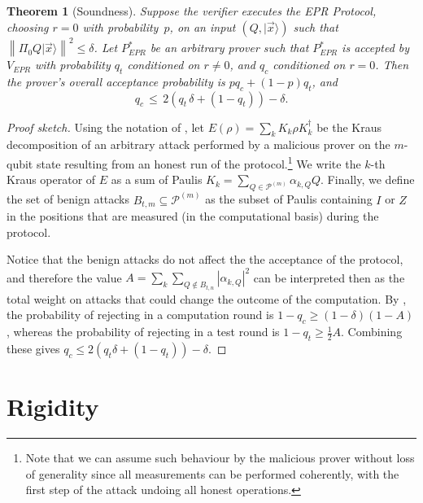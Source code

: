 \documentclass[11pt]{article}
\newtheorem{theorem}{Theorem}
\newcommand{\ket}[1]{|#1\rangle}
\newcommand{\norm}[1]{\left\|#1\right\|}
\newcommand{\paulin}{\mathcal{P}^{(m)}\!}
\begin{document}
\begin{theorem}[Soundness]\label{thm:EPR-soundness} 
Suppose the verifier executes the EPR Protocol, choosing $r=0$ with probability~$p$, on an input $(Q,\ket{\vec{x}})$ such that $\norm{\Pi_0 Q\ket{\vec{x}}}^2\leq \delta$. Let $P_{EPR}^*$ be an arbitrary prover such that $P_{EPR}^*$ is accepted by  $V_{EPR}$ with probability $q_t$ conditioned on $r\neq 0$, and $q_c$ conditioned on $r=0$. Then the prover's overall acceptance probability is $pq_c+(1-p)q_t$, and
$$q_c \,\leq\, 2\left(q_t\,\delta+(1-q_t)\right)-\delta.$$ 
\end{theorem}
\begin{proof}[Proof sketch]
Using the notation of \cite{broadbent15howtoverify}, let $E(\rho) = \sum_{k} K_k \rho K_k^\dagger$ be the Kraus decomposition of an arbitrary attack  performed by a malicious prover on the $m$-qubit state resulting from an honest run of the protocol.\footnote{Note that we can assume such behaviour by the malicious prover without loss of generality since  all measurements can be performed coherently, with the first step of the attack undoing all honest operations.}  We write the $k$-th Kraus operator of $E$ as a sum of Paulis $K_k = \sum_{Q\in
  \paulin} \alpha_{k,Q} Q$. Finally, we define the set of benign attacks $B_{t,m} \subseteq \paulin$ as the subset of Paulis containing $I$ or $Z$ in the positions that are measured (in the computational basis) during the protocol.
  
  Notice that the benign attacks do not affect the the acceptance of the protocol, and therefore the value 
$A=\sum_k\sum_{Q 
\not\in
  B_{t,n}}|\alpha_{k,Q}|^2$ can be interpreted then as the total weight on attacks that could change the outcome of the computation. By \cite{broadbent15howtoverify}, the probability of rejecting in a computation round is $1-q_c\geq (1-\delta)(1-A)$, whereas the probability of rejecting in a test round is $1-q_t\geq \frac{1}{2}A$. Combining these gives $q_c\leq 2(q_t\delta+(1-q_t))-\delta$.
\end{proof}







\section{Rigidity}
\label{sec:intro-rigidity}

\end{document}
